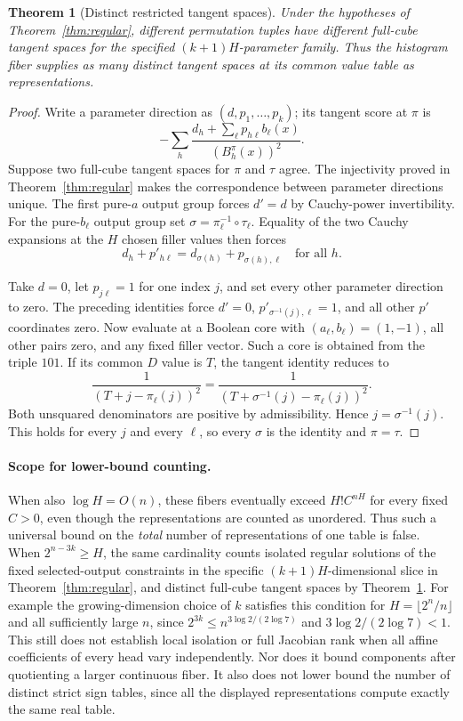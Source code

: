 \documentclass[11pt]{article}
\newtheorem{theorem}{Theorem}
\begin{document}
\begin{theorem}[Distinct restricted tangent spaces]\label{thm:tangents}
Under the hypotheses of Theorem~\ref{thm:regular}, different permutation
tuples have different full-cube tangent spaces for the specified
$(k+1)H$-parameter family. Thus the histogram fiber supplies as many
distinct tangent spaces at its common value table as representations.
\end{theorem}
\begin{proof}
Write a parameter direction as $(d,p_1,\ldots,p_k)$; its tangent
score at $\pi$ is
\[
 -\sum_h\frac{d_h+\sum_\ell p_{h\ell}b_\ell(x)}
                  {(B_h^\pi(x))^2}.
\]
Suppose two full-cube tangent spaces for $\pi$ and $\tau$ agree.
The injectivity proved in Theorem~\ref{thm:regular} makes the
correspondence between parameter directions unique. The first
pure-$a$ output group forces $d'=d$ by Cauchy-power invertibility.
For the pure-$b_\ell$ output group set
$\sigma=\pi_\ell^{-1}\circ\tau_\ell$. Equality of the two
Cauchy expansions at the $H$ chosen filler values then forces
\[
 d_h+p'_{h\ell}=d_{\sigma(h)}+p_{\sigma(h),\ell}
 \quad\text{for all }h.
\]

Take $d=0$, let $p_{j\ell}=1$ for one index $j$, and set every other
parameter direction to zero. The preceding identities force
$d'=0$, $p'_{\sigma^{-1}(j),\ell}=1$, and all other $p'$ coordinates
zero. Now evaluate at a Boolean core with
$(a_\ell,b_\ell)=(1,-1)$, all other pairs zero, and any fixed filler
vector. Such a core is obtained from the triple $101$. If its common
$D$ value is $T$, the tangent identity reduces to
\[
 \frac1{(T+j-\pi_\ell(j))^2}
 =\frac1{(T+\sigma^{-1}(j)-\pi_\ell(j))^2}.
\]
Both unsquared denominators are positive by admissibility. Hence
$j=\sigma^{-1}(j)$. This holds for every $j$ and every $\ell$, so
every $\sigma$ is the identity and $\pi=\tau$.
\end{proof}

\paragraph{Scope for lower-bound counting.}
When also $\log H=O(n)$, these fibers eventually exceed
$H!C^{nH}$ for every fixed $C>0$, even though the representations
are counted as unordered. Thus such a universal bound on the
\emph{total} number of representations of one table is false.
When $2^{n-3k}\geq H$, the same cardinality counts isolated
regular solutions of the fixed selected-output constraints in
the specific $(k+1)H$-dimensional slice in
Theorem~\ref{thm:regular}, and distinct full-cube tangent spaces by
Theorem~\ref{thm:tangents}. For example the growing-dimension
choice of $k$ satisfies this condition for
$H=\lfloor2^n/n\rfloor$ and all sufficiently large $n$, since
$2^{3k}\leq n^{3\log2/(2\log7)}$ and
$3\log2/(2\log7)<1$.
This still does not establish local isolation or full Jacobian
rank when all affine coefficients of every head vary independently.
Nor does it bound components after quotienting a larger continuous
fiber. It also does not lower bound the number of distinct
strict sign tables, since all the displayed representations compute
exactly the same real table.
\end{document}
